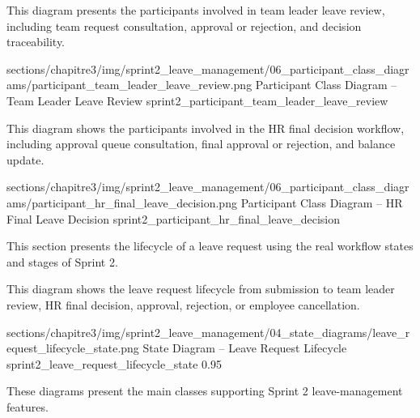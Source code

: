 \Needspace{8.5cm}

\noindent This diagram presents the participants involved in team leader leave review, including team request consultation, approval or rejection, and decision traceability.\par

\ChapterThreeFigure
{sections/chapitre3/img/sprint2_leave_management/06_participant_class_diagrams/participant_team_leader_leave_review.png}
{Participant Class Diagram -- Team Leader Leave Review}
{sprint2_participant_team_leader_leave_review}

\Needspace{8.5cm}

\noindent This diagram shows the participants involved in the HR final decision workflow, including approval queue consultation, final approval or rejection, and balance update.\par

\ChapterThreeFigure
{sections/chapitre3/img/sprint2_leave_management/06_participant_class_diagrams/participant_hr_final_leave_decision.png}
{Participant Class Diagram -- HR Final Leave Decision}
{sprint2_participant_hr_final_leave_decision}


{\fontsize{12}{18}\selectfont
\setlength{\parindent}{1.2cm}
\setlength{\parskip}{6pt}

\indent This section presents the lifecycle of a leave request using the real workflow states and stages of Sprint 2.

}

\Needspace{8.5cm}

\noindent This diagram shows the leave request lifecycle from submission to team leader review, HR final decision, approval, rejection, or employee cancellation.\par

\ChapterThreeFigureSized
{sections/chapitre3/img/sprint2_leave_management/04_state_diagrams/leave_request_lifecycle_state.png} 
{State Diagram -- Leave Request Lifecycle}
{sprint2_leave_request_lifecycle_state}
{0.95}


{\fontsize{12}{18}\selectfont
\setlength{\parindent}{1.2cm}
\setlength{\parskip}{6pt}

\indent These diagrams present the main classes supporting Sprint 2 leave-management features.

}

